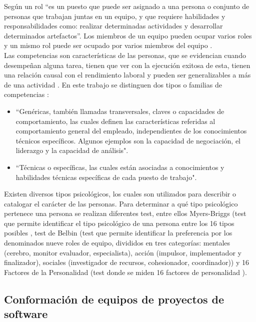 Según \cite{64} un rol “es un puesto que puede ser asignado a una persona o conjunto de personas que trabajan juntas en un equipo, y que requiere habilidades y responsabilidades como: realizar determinadas actividades y desarrollar determinados artefactos”. Los miembros de un equipo pueden ocupar varios roles y un mismo rol puede ser ocupado por varios miembros del equipo \citep{Mayi09}.\\

Las competencias son características de las personas, que se evidencian cuando desempeñan alguna tarea, tienen que ver con la ejecución exitosa de esta, tienen una relación causal con el rendimiento laboral y pueden ser generalizables a más de una actividad \cite{Boyatzis1982}. En este trabajo se distinguen dos tipos o familias de competencias \citep{Mayi09, 76}:
\begin{itemize}
	\item  “Genéricas, también llamadas transversales, claves o capacidades de comportamiento, las cuales definen las características referidas al comportamiento general del empleado, independientes de los conocimientos técnicos específicos. Algunos ejemplos son la capacidad de negociación, el liderazgo y la capacidad de análisis".
	\item  “Técnicas o específicas, las cuales están asociadas a conocimientos y habilidades técnicas específicas de cada puesto de trabajo".\\
\end{itemize}

Existen diversos tipos psicológicos, los cuales son utilizados para describir o catalogar el carácter de las personas. Para determinar a qué tipo psicológico pertenece una persona se realizan diferentes test, entre ellos Myers-Briggs (test que permite identificar el tipo psicológico de una persona entre los 16 tipos posibles \citep{117, 119}, test de Belbin (test que permite identificar la preferencia por los denominados nueve roles de equipo, divididos en tres categorías: mentales (cerebro, monitor evaluador, especialista), acción (impulsor, implementador y finalizador), sociales (investigador de recursos, cohesionador, coordinador)) y 16 Factores de la Personalidad (test donde se miden 16 factores de personalidad \citep{118}).

\subsection{Conformación de equipos de proyectos de software}

